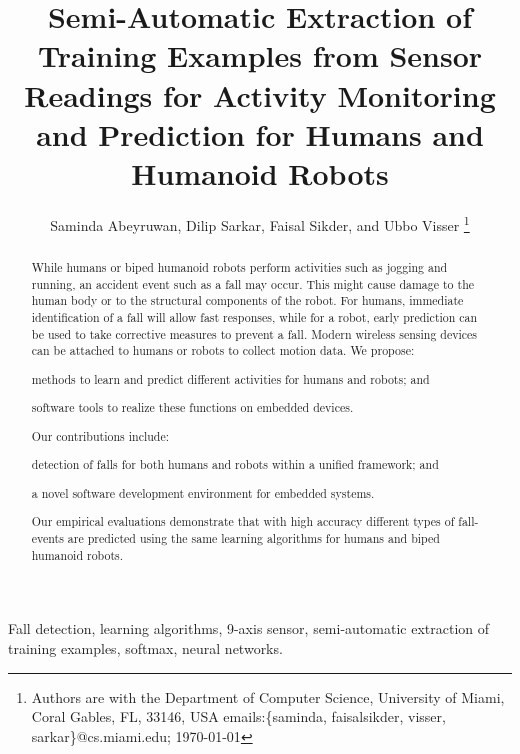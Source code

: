 \documentclass{IEEEtran}
\title{Semi-Automatic Extraction of  Training Examples from Sensor Readings for Activity Monitoring and Prediction for Humans and Humanoid Robots}
\author{{Saminda Abeyruwan}, {Dilip Sarkar}, {Faisal Sikder},   and {Ubbo Visser}
\thanks{ Authors are with
 the
Department of Computer Science, University of Miami,
  Coral Gables, FL, 33146, USA
{ emails:\{saminda, faisalsikder, visser, sarkar\}@cs.miami.edu};
\today} }
\begin{document}
\maketitle

\begin{abstract}
While humans or biped humanoid robots perform activities such as jogging and running, an accident 
event such as a fall may occur. This might cause damage to the human body or 
to the structural components of the robot. For humans, immediate identification of a fall 
will allow fast responses, while for a robot, early prediction can be used to take corrective 
measures to prevent a fall. Modern wireless sensing devices can be attached to humans or robots to 
collect motion data. We propose: \begin{inparaenum}[($i$)] \item 
methods to learn and predict different activities for humans and robots; and \item software 
tools to realize these functions  on embedded devices. \end{inparaenum} Our contributions include: 
\begin{inparaenum}[($i$)] \item detection of falls for both humans and robots within a unified 
framework; and \item  a  novel software development environment for embedded systems. 
\end{inparaenum} Our empirical evaluations demonstrate that with high accuracy different types of  
fall-events are predicted using the same learning algorithms for humans and biped humanoid robots. 
\end{abstract}

\begin{IEEEkeywords} Fall detection, learning algorithms, 9-axis sensor, semi-automatic extraction of training examples,  softmax, neural networks.
\end{IEEEkeywords}

\end{document}

